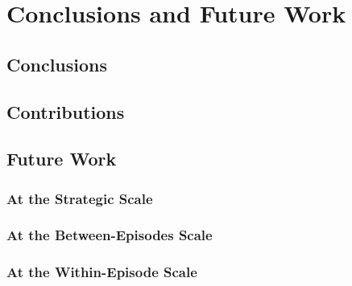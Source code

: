 \chapter[Conclusions and Future Work]{Conclusions and Future Work}
\label{chap:Conclusions}

\section{Conclusions}
\label{conclusions}


\section{Contributions}
\label{contributions}

\section{Future Work}
\label{futurework}

\subsection{At the Strategic Scale}

\subsection{At the Between-Episodes Scale}

\subsection{At the Within-Episode Scale}